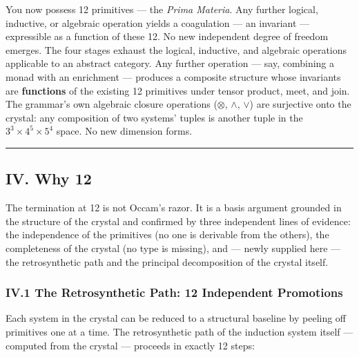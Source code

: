\documentclass[12pt,a4paper]{article}
\begin{document}
You now possess 12 primitives --- the \emph{Prima Materia}. Any further logical, inductive, or algebraic operation yields a coagulation --- an invariant --- expressible as a function of these 12. No new independent degree of freedom emerges. The four stages exhaust the logical, inductive, and algebraic operations applicable to an abstract category. Any further operation --- say, combining a monad with an enrichment --- produces a composite structure whose invariants are \textbf{functions} of the existing 12 primitives under tensor product, meet, and join. The grammar's own algebraic closure operations ($\otimes$, $\wedge$, $\vee$) are surjective onto the crystal: any composition of two systems' tuples is another tuple in the $3^3 \times 4^5 \times 5^4$ space. No new dimension forms.

\begin{center}
\rule{0.5\textwidth}{0.4pt}
\end{center}

\subsection{IV. Why 12}
The termination at 12 is not Occam's razor. It is a basis argument grounded in the structure of the crystal and confirmed by three independent lines of evidence: the independence of the primitives (no one is derivable from the others), the completeness of the crystal (no type is missing), and --- newly supplied here --- the retrosynthetic path and the principal decomposition of the crystal itself.

\subsubsection{IV.1 The Retrosynthetic Path: 12 Independent Promotions}
Each system in the crystal can be reduced to a structural baseline by peeling off primitives one at a time. The retrosynthetic path of the induction system itself --- computed from the crystal --- proceeds in exactly 12 steps:
\end{document}
